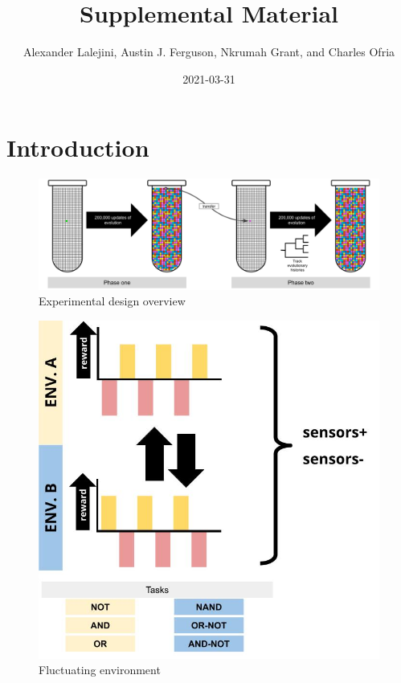 \documentclass[]{book}
\title{Supplemental Material}
\author{Alexander Lalejini, Austin J. Ferguson, Nkrumah Grant, and Charles Ofria}
\date{2021-03-31}
\begin{document}
\maketitle

{
\setcounter{tocdepth}{1}
\tableofcontents
}
\hypertarget{introduction}{%
\chapter{Introduction}\label{introduction}}

\begin{figure}
\centering
\includegraphics{media/experimental-design-overview.png}
\caption{Experimental design overview}
\end{figure}

\begin{figure}
\centering
\includegraphics{media/fluctuating-environment.jpg}
\caption{Fluctuating environment}
\end{figure}
\end{document}
